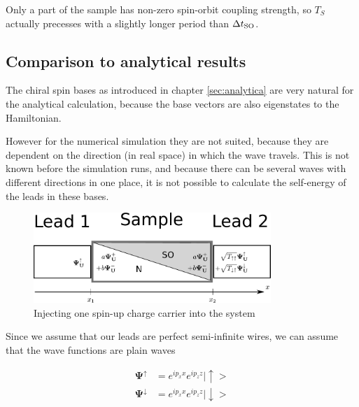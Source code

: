 Only a part of the sample has non-zero spin-orbit coupling strength, so $T_S$
actually precesses with a slightly longer period than $\Delta t_{\textnormal{SO}}$.

\subsection{Comparison to analytical results}

The chiral spin bases as introduced in chapter \ref{sec:analytica} are very
natural for the analytical calculation, because the
base vectors are also eigenstates to the Hamiltonian.

However for the numerical simulation they are not suited, because they are
dependent on the direction (in real space) in which the wave travels. This
is not known before the simulation runs, and because there can be several
waves with different directions in one place, it is not possible to calculate
the self-energy of the leads in these bases.

\begin{figure}
    \begin{center}
    \includegraphics[width=0.8\textwidth]{adapting-pic.pdf}
    \end{center}
    \caption{Injecting one spin-up charge carrier into the system}
\end{figure}


Since we assume that our leads are perfect semi-infinite wires, we can assume
that the wave functions are plain waves

\begin{align*}
    \mathbf{\Psi^\uparrow}   &=  e^{i p_x x} e^{i p_z z} |\uparrow> \\
    \mathbf{\Psi^\downarrow} &=  e^{i p_x x} e^{i p_z z} |\downarrow> \\
\end{align*}

